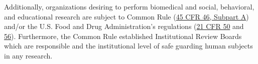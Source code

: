 \documentclass{article}
\begin{document}
Additionally, organizations desiring to perform biomedical and social, behavioral, and educational research are subject to Common Rule (\href{https://www.hhs.gov/ohrp/regulations-and-policy/regulations/45-cfr-46/index.html#subparta}{45 CFR 46, Subpart A}) and/or the U.S. Food and Drug Administration’s regulations (\href{https://www.ecfr.gov/cgi-bin/text-idx?SID=faa4b2b2900a70fbcac4a773c9da0f0f&mc=true&node=pt21.1.50&rgn=div5}{21 CFR 50} and \href{https://www.ecfr.gov/cgi-bin/text-idx?SID=faa4b2b2900a70fbcac4a773c9da0f0f&mc=true&node=pt21.1.56&rgn=div5}{56}). Furthermore, the Common Rule established Institutional Review Boards which are responsible and the institutional level of safe guarding human subjects in any research. 




\end{document}
